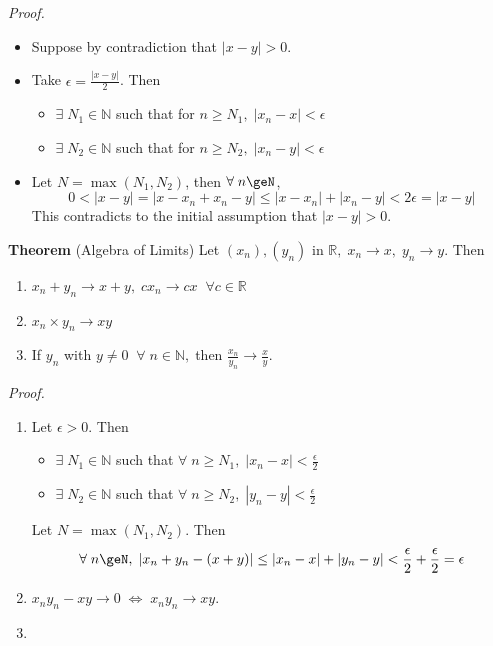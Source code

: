 \documentclass[12pt]{article}
\begin{document}
\vspace{1\baselineskip}
\begin{block}{\sl Proof.} 
\begin{itemize}
    \item Suppose by contradiction that $|x-y|>0$.
    \item Take $\epsilon=\frac{|x-y|}{2}$. Then
    \begin{itemize}
        \item $\exists\;N_1\in\mathbb{N}$ such that for $n\ge N_1,\;|x_n-x|<\epsilon$
        \item $\exists\;N_2\in\mathbb{N}$ such that for $n\ge N_2,\;|x_n-y|<\epsilon$
    \end{itemize}
    \item Let $N= \max(N_1,N_2)$, then $\forall\;n\geN$,
    $$0<|x-y| = |x-x_n+x_n-y| \le |x-x_n|+|x_n-y|<2\epsilon = |x-y|$$
    This contradicts to the initial assumption that $|x-y|>0$.
\end{itemize}
\end{block}

\newpage
\begin{block}{\bf Theorem} (Algebra of Limits) Let $(x_n), (y_n)$ in $\mathbb{R},\; x_n\to x,\; y_n\to y$. Then
\begin{enumerate}[label=(\roman*)]
    \item $x_n+y_n \to x+y,\; cx_n\to cx\;\;\forall c\in\mathbb{R}$
    \item $x_n\times y_n \to xy$
    \item If $y_n$ with $y\neq 0\;\;\forall\;n\in\mathbb{N},\;$then $\frac{x_n}{y_n}\to \frac{x}{y}.$
\end{enumerate}
\end{block}

\vspace{1\baselineskip}
\begin{block}{\sl Proof.}
\begin{enumerate}[label=(\roman*)]
    \item Let $\epsilon >0$. Then 
    \begin{itemize}
        \item $\exists\;N_1\in\mathbb{N}$ such that $\forall\;n\ge N_1,\;|x_n-x|<\frac{\epsilon}{2}$
        \item $\exists\;N_2\in\mathbb{N}$ such that $\forall\;n\ge N_2,\;|y_n-y|<\frac{\epsilon}{2}$
    \end{itemize}
    Let $N=\max(N_1,N_2)$. Then 
    $$\forall\;n\geN,\;|x_n+y_n-(x+y)|\le |x_n-x|+|y_n-y|<\frac{\epsilon}{2}+\frac{\epsilon}{2}=\epsilon$$
    
    \item $x_ny_n - xy \to 0\;\Leftrightarrow\; x_ny_n\to xy$.
    \item 
\end{enumerate}
\end{block}
\end{document}
